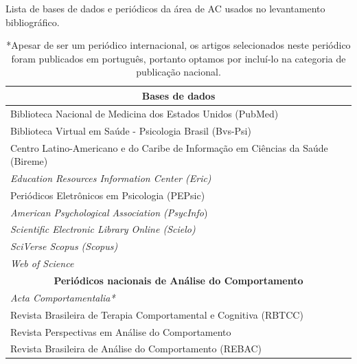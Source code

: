 \begin{table}[]
\caption{Lista de bases de dados e periódicos da área de AC usados no levantamento bibliográfico.}
\begin{adjustbox}{max width=1\textwidth}
\begin{tabular}{@{}l@{}}
\toprule
\multicolumn{1}{c}{\textbf{Bases de dados}}                                     \\ \midrule
Biblioteca Nacional de Medicina dos Estados Unidos (PubMed)                     \\
Biblioteca Virtual em Saúde - Psicologia Brasil (Bvs-Psi)                       \\
Centro Latino-Americano e do Caribe de Informação em Ciências da	Saúde (Bireme) \\
\textit{Education Resources Information Center  (Eric)}                                  \\
Periódicos Eletrônicos em Psicologia (PEPsic)                                   \\
\textit{American Psychological Association (PsycInfo})                                   \\
\textit{Scientific	Electronic Library Online (Scielo) }                                  \\
\textit{SciVerse Scopus (Scopus)}                                                        \\
\textit{Web	of Science   }                                                               \\ \midrule
\multicolumn{1}{c}{\textbf{Periódicos nacionais de Análise do Comportamento}}   \\ \midrule
\textit{\textit{Acta Comportamentalia*}}                                                 \\
Revista Brasileira de Terapia Comportamental e Cognitiva (RBTCC)                \\
Revista Perspectivas em Análise do Comportamento                                \\
Revista Brasileira de Análise do Comportamento (REBAC)                          \\ \bottomrule
\end{tabular}
\end{adjustbox}
\caption*{*Apesar de ser um periódico internacional, os artigos selecionados neste periódico foram publicados em português, portanto optamos por incluí-lo na categoria de publicação nacional.}
\end{table}

